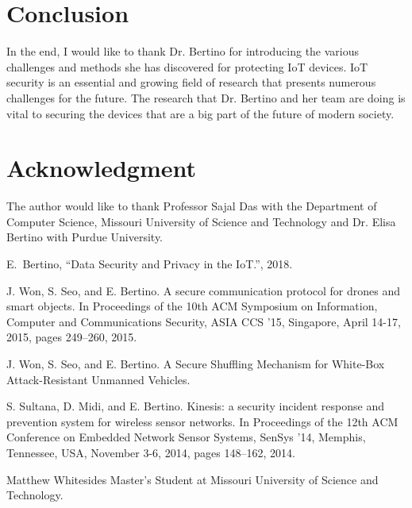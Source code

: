 \documentclass[journal,onecolumn]{IEEEtran}
\begin{document}
\section{Conclusion}

In the end, I would like to thank Dr. Bertino for introducing the various challenges and methods she has discovered for protecting IoT devices. IoT security is an essential and growing field of research that presents numerous challenges for the future. The research that Dr. Bertino and her team are doing is vital to securing the devices that are a big part of the future of modern society. 




\section*{Acknowledgment}
The author would like to thank Professor Sajal Das with the Department of Computer Science, Missouri University of Science and Technology and Dr. Elisa Bertino with Purdue University.

\ifCLASSOPTIONcaptionsoff
  \newpage
\fi

\begin{thebibliography}{1}

E.~Bertino, ``Data Security and Privacy in the IoT.'', 2018. 

J. Won, S. Seo, and E. Bertino. A secure communication protocol for drones and smart objects. In Proceedings of the 10th ACM Symposium on Information, Computer and Communications Security, ASIA CCS ’15, Singapore, April 14-17, 2015, pages 249–260, 2015.

J. Won, S. Seo, and E. Bertino. A Secure Shuffling Mechanism for White-Box Attack-Resistant Unmanned Vehicles.

S. Sultana, D. Midi, and E. Bertino. Kinesis: a security incident response and prevention system for wireless sensor networks. In Proceedings of the 12th ACM Conference on Embedded Network Sensor Systems, SenSys ’14, Memphis, Tennessee, USA, November 3-6, 2014, pages 148–162, 2014.


\end{thebibliography}

\begin{IEEEbiographynophoto}{Matthew Whitesides}
  Master's Student at Missouri University of Science and Technology.
\end{IEEEbiographynophoto}

\end{document}
